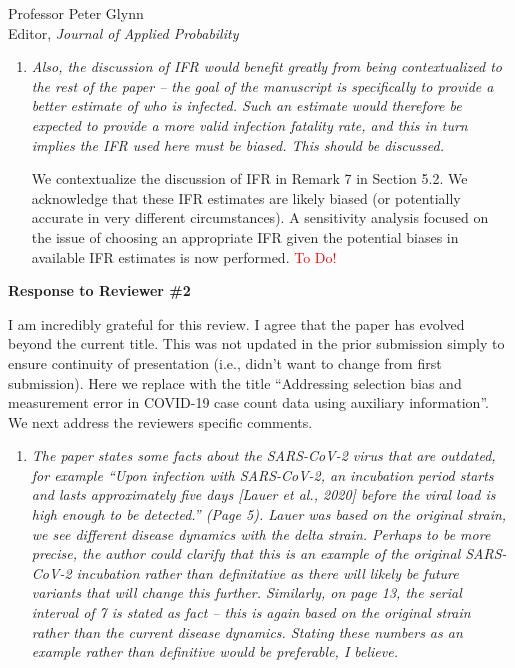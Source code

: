 \documentclass[11pt]{letter} %
\begin{document}
\begin{letter}{Professor
	Peter Glynn\\
	Editor, {\em Journal of Applied Probability}}
\begin{enumerate}
\begin{enumerate}
	See our answer to Question 12 above.  In Section 5.2, we now clarify how we calculate the infection-fatality rate from the compartments of the model. Similar to Johndrow (2021), the model only uses COVID-19 related deaths.  Deaths to non-COVID causes are not directly modeled but would appear as part of the R component in the global SEIR model.
	\vspace{5mm}
	\item {\it Also, the discussion of IFR would benefit greatly from being contextualized to the rest of the paper – the goal of the manuscript is specifically to provide a better estimate of who is infected. Such an estimate would therefore be expected to provide a more valid infection fatality rate, and this in turn implies the IFR used here must be biased. This should be discussed.}
	\vspace{5mm}

    We contextualize the discussion of IFR in Remark 7 in Section 5.2. We acknowledge that these IFR estimates are likely biased (or potentially accurate in very different circumstances).  A sensitivity analysis focused on the issue of choosing an appropriate IFR given the potential biases in available IFR estimates is now performed.
    \textcolor{red}{To Do!}
	\vspace{5mm}
\end{enumerate}
\end{enumerate}
\newpage

{\bf Response to Reviewer \#2}

I am incredibly grateful for this review.  I agree that the paper has evolved beyond the current title.  This was not updated in the prior submission simply to ensure continuity of presentation (i.e., didn't want to change from first submission).  Here we replace with the title ``Addressing selection bias and measurement error in COVID-19 case count data using auxiliary information''.  We next address the reviewers specific comments.

\begin{enumerate}
\item {\it The paper states some facts about the SARS-CoV-2 virus that are outdated, for example “Upon infection with SARS-CoV-2, an incubation period starts and lasts approximately five days [Lauer et al., 2020] before the viral load is high enough to be detected.” (Page 5). Lauer was based on the original
strain, we see different disease dynamics with the delta strain. Perhaps to be more precise, the author could clarify that this is an example of the original SARS-CoV-2 incubation rather than definitative as there will likely be future variants that will change this further. Similarly, on page 13, the serial
interval of 7 is stated as fact – this is again based on the original strain rather than the current disease dynamics. Stating these numbers as an example rather than definitive would be preferable, I believe.}
\vspace{5mm}


\end{enumerate}
\end{letter}
\end{document}
